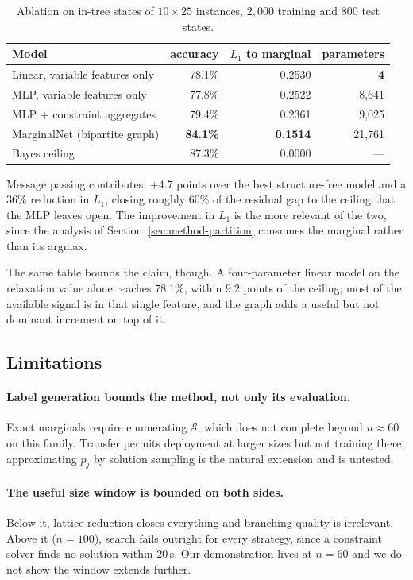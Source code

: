 \documentclass[11pt]{article}
\newcommand{\SOL}{\mathcal{S}}
\begin{document}
\begin{table}[h]
\centering
\begin{tabular}{lrrr}
\toprule
Model & accuracy & $L_1$ to marginal & parameters \\
\midrule
Linear, variable features only & 78.1\% & 0.2530 & \textbf{4} \\
MLP, variable features only & 77.8\% & 0.2522 & 8{,}641 \\
MLP + constraint aggregates & 79.4\% & 0.2361 & 9{,}025 \\
MarginalNet (bipartite graph) & \textbf{84.1\%} & \textbf{0.1514} & 21{,}761 \\
\midrule
Bayes ceiling & 87.3\% & 0.0000 & --- \\
\bottomrule
\end{tabular}
\caption{Ablation on in-tree states of $10\times25$ instances, $2{,}000$ training and $800$ test states.}
\label{tab:ablation}
\end{table}

Message passing contributes: $+4.7$ points over the best structure-free model and a $36\%$ reduction in $L_1$, closing roughly $60\%$ of the residual gap to the ceiling that the MLP leaves open. The improvement in $L_1$ is the more relevant of the two, since the analysis of Section~\ref{sec:method-partition} consumes the marginal rather than its argmax.

The same table bounds the claim, though. A four-parameter linear model on the relaxation value alone reaches $78.1\%$, within $9.2$ points of the ceiling; most of the available signal is in that single feature, and the graph adds a useful but not dominant increment on top of it.

\subsection{Limitations}
\label{sec:exp-limits}

\paragraph{Label generation bounds the method, not only its evaluation.} Exact marginals require enumerating $\SOL$, which does not complete beyond $n\approx60$ on this family. Transfer permits deployment at larger sizes but not training there; approximating $p_j$ by solution sampling is the natural extension and is untested.

\paragraph{The useful size window is bounded on both sides.} Below it, lattice reduction closes everything and branching quality is irrelevant. Above it ($n=100$), search fails outright for every strategy, since a constraint solver finds no solution within $20$\,s. Our demonstration lives at $n=60$ and we do not show the window extends further.
\end{document}
